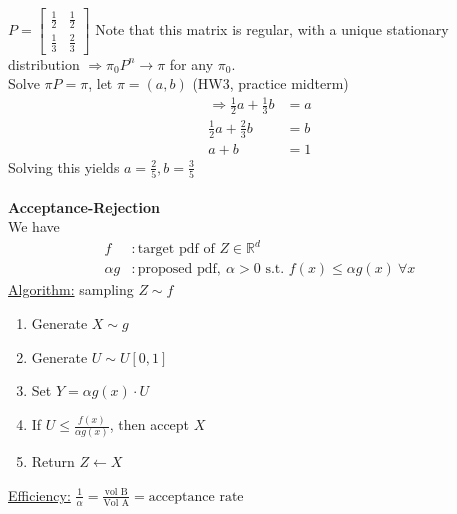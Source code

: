 \documentclass[12pt, letterpaper]{article}
\begin{document}
 $P = \begin{bmatrix}
    \frac 12 & \frac 12 \\ \frac 13 & \frac 23
\end{bmatrix}$
Note that this matrix is regular, with a unique stationary distribution $\Rightarrow \pi_0 P^n \rightarrow\pi$ 
for any $\pi_0$. \\
Solve $\pi P = \pi$, let $\pi = (a,b)$ (HW3, practice midterm)
\begin{align*}
    \Rightarrow \frac 12 a+ \frac 13 b &= a \\
    \frac 12 a + \frac 23 b &= b \\
    a+b &= 1
\end{align*}
Solving this yields $a = \frac 25, b = \frac 35$ \\ \\
\textbf{Acceptance-Rejection} \\
We have 
\begin{align*}
    f &: \text{target pdf of } Z \in \mathbb{R}^d \\
    \alpha g &: \text{proposed pdf},\ \alpha > 0 \text{ s.t. } f(x) \le \alpha g(x)\ \forall x
\end{align*}
\underline{Algorithm:} sampling $Z \sim f$
\begin{enumerate}
    \item Generate $X \sim g$ 
    \item Generate $U \sim U[0,1]$
    \item Set $Y = \alpha g(x) \cdot U$
    \item If $U \le \frac{f(x)}{\alpha g(x)}$, then accept $X$
    \item Return $Z \leftarrow X$
\end{enumerate}
\underline{Efficiency:} $\frac 1\alpha = \frac{\text{vol B}}{\text{Vol A}} = \text{acceptance rate}$
\end{document}

